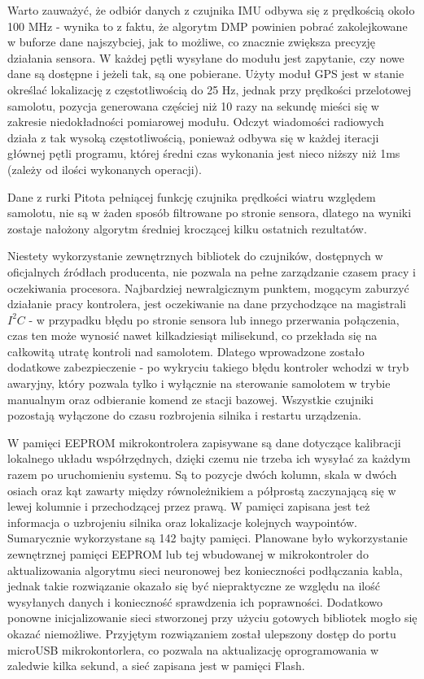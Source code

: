 \documentclass[12pt, a4paper]{article}
\begin{document}
Warto zauważyć, że odbiór danych z czujnika IMU odbywa się z prędkością około 100 MHz - wynika to z faktu, że algorytm DMP powinien pobrać zakolejkowane w buforze dane najszybciej, jak to możliwe, co znacznie zwiększa precyzję działania sensora. W każdej pętli wysyłane do modułu jest zapytanie, czy nowe dane są dostępne i jeżeli tak, są one pobierane. Użyty moduł GPS jest w stanie określać lokalizację z częstotliwością do 25 Hz, jednak przy prędkości przelotowej samolotu, pozycja generowana częściej niż 10 razy na sekundę mieści się w zakresie niedokładności pomiarowej modułu. Odczyt wiadomości radiowych działa z tak wysoką częstotliwością, ponieważ odbywa się w każdej iteracji głównej pętli programu, której średni czas wykonania jest nieco niższy niż 1ms (zależy od ilości wykonanych operacji).

Dane z rurki Pitota pełniącej funkcję czujnika prędkości wiatru względem samolotu, nie są w żaden sposób filtrowane po stronie sensora, dlatego na wyniki zostaje nałożony algorytm średniej kroczącej kilku ostatnich rezultatów.

Niestety wykorzystanie zewnętrznych bibliotek do czujników, dostępnych w oficjalnych źródłach producenta, nie pozwala na pełne zarządzanie czasem pracy i oczekiwania procesora. Najbardziej newralgicznym punktem, mogącym zaburzyć działanie pracy kontrolera, jest oczekiwanie na dane przychodzące na magistrali $I^2C$ - w przypadku błędu po stronie sensora lub innego przerwania połączenia, czas ten może wynosić nawet kilkadziesiąt milisekund, co przekłada się na całkowitą utratę kontroli nad samolotem. Dlatego wprowadzone zostało dodatkowe zabezpieczenie - po wykryciu takiego błędu kontroler wchodzi w tryb awaryjny, który pozwala tylko i wyłącznie na sterowanie samolotem w trybie manualnym oraz odbieranie komend ze stacji bazowej. Wszystkie czujniki pozostają wyłączone do czasu rozbrojenia silnika i restartu urządzenia.

W pamięci EEPROM mikrokontrolera zapisywane są dane dotyczące kalibracji lokalnego  układu współrzędnych, dzięki czemu nie trzeba ich wysyłać za każdym razem po uruchomieniu systemu. Są to pozycje dwóch kolumn, skala w dwóch osiach oraz kąt zawarty między równoleżnikiem a półprostą zaczynającą się w lewej kolumnie i przechodzącej przez prawą. W pamięci zapisana jest też informacja o uzbrojeniu silnika oraz lokalizacje kolejnych waypointów. Sumarycznie wykorzystane są 142 bajty pamięci. Planowane było wykorzystanie zewnętrznej pamięci EEPROM lub tej wbudowanej w mikrokontroler do aktualizowania algorytmu sieci neuronowej bez konieczności podłączania kabla, jednak takie rozwiązanie okazało się być niepraktyczne ze względu na ilość wysyłanych danych i konieczność sprawdzenia ich poprawności. Dodatkowo ponowne inicjalizowanie sieci stworzonej przy użyciu gotowych bibliotek mogło się okazać niemożliwe. Przyjętym rozwiązaniem został ulepszony dostęp do portu microUSB mikrokontorlera, co pozwala na aktualizację oprogramowania w zaledwie kilka sekund, a sieć zapisana jest w pamięci Flash.
\end{document}
